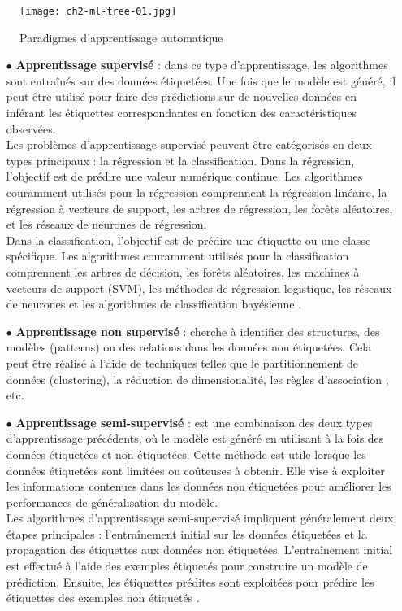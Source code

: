 \begin{figure}[H]
	\centering
	\texttt{[image: ch2-ml-tree-01.jpg]}
	\caption{Paradigmes d'apprentissage automatique}
    \label{fig:ch2-ml-tree-01}
\end{figure}

\begin{enumerate}
\item [$\bullet$] \textbf{Apprentissage supervisé} : dans ce type d'apprentissage, les algorithmes sont entraînés sur des données étiquetées. 
Une fois que le modèle est généré, il peut être utilisé pour faire des prédictions sur de nouvelles données en inférant les étiquettes correspondantes en fonction des caractéristiques observées.\\
Les problèmes d'apprentissage supervisé peuvent être catégorisés en deux types principaux : la régression et la classification. Dans la régression, l'objectif est de prédire une valeur numérique continue. Les algorithmes couramment utilisés pour la régression comprennent la régression linéaire, la régression à vecteurs de support, les arbres de régression, les forêts aléatoires, et les réseaux de neurones de régression.
\\
Dans la classification, l'objectif est de prédire une étiquette ou une classe spécifique. Les algorithmes couramment utilisés pour la classification comprennent les arbres de décision, les forêts aléatoires, les machines à vecteurs de support (SVM), les méthodes de régression logistique, les réseaux de neurones et les algorithmes de classification bayésienne \cite{ch_Deep_Learning}.

\item [$\bullet$] \textbf{Apprentissage non supervisé} : cherche à identifier des structures, des modèles (patterns) ou des relations dans les données non étiquetées. Cela peut être réalisé à l'aide de techniques telles que le partitionnement de données (clustering), la réduction de dimensionalité, les règles d'association \cite{ch_Deep_Learning}, etc. 

\item [$\bullet$] \textbf{Apprentissage semi-supervisé } : est une combinaison des deux types d'apprentissage précédents, où le modèle est généré en utilisant à la fois des données étiquetées et non étiquetées. Cette méthode est utile lorsque les données étiquetées sont limitées ou coûteuses à obtenir. Elle vise à exploiter les informations contenues dans les données non étiquetées pour améliorer les performances de généralisation du modèle.
\\
Les algorithmes d'apprentissage semi-supervisé impliquent généralement deux étapes principales : l'entraînement initial sur les données étiquetées et la propagation des étiquettes aux données non étiquetées. L'entraînement initial est effectué à l'aide des exemples étiquetés pour construire un modèle de prédiction. Ensuite, les étiquettes prédites sont exploitées pour prédire les étiquettes des exemples non étiquetés \cite{semi-supervise_chapelle2006semi}.


\end{enumerate}
